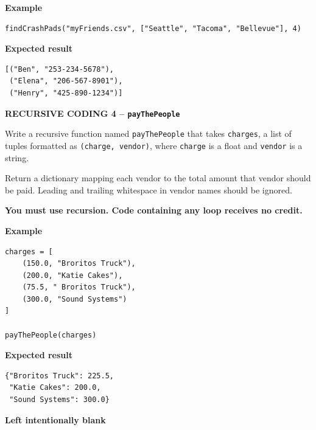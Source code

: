 \documentclass[11pt,addpoints]{exam}
\begin{document}
\begin{questions}
\textbf{Example}
\begin{lstlisting}
findCrashPads("myFriends.csv", ["Seattle", "Tacoma", "Bellevue"], 4)
\end{lstlisting}

\textbf{Expected result}
\begin{lstlisting}
[("Ben", "253-234-5678"),
 ("Elena", "206-567-8901"),
 ("Henry", "425-890-1234")]
\end{lstlisting}

\vfill
\noindent\fbox{\parbox[t][4in][t]{\dimexpr\linewidth-2\fboxsep-2\fboxrule\relax}{\strut}}
\vfill

\newpage
\question[14] \textbf{RECURSIVE CODING 4 -- \texttt{payThePeople}}

Write a recursive function named \texttt{payThePeople} that takes \texttt{charges}, a list of tuples formatted as \texttt{(charge, vendor)}, where \texttt{charge} is a float and \texttt{vendor} is a string.

Return a dictionary mapping each vendor to the total amount that vendor should be paid. Leading and trailing whitespace in vendor names should be ignored.

\textbf{You must use recursion. Code containing any loop receives no credit.}

\textbf{Example}
\begin{lstlisting}
charges = [
    (150.0, "Broritos Truck"),
    (200.0, "Katie Cakes"),
    (75.5, " Broritos Truck"),
    (300.0, "Sound Systems")
]

payThePeople(charges)
\end{lstlisting}

\textbf{Expected result}
\begin{lstlisting}
{"Broritos Truck": 225.5,
 "Katie Cakes": 200.0,
 "Sound Systems": 300.0}
\end{lstlisting}

\vfill
\noindent\fbox{\parbox[t][5in][t]{\dimexpr\linewidth-2\fboxsep-2\fboxrule\relax}{\strut}}
\vfill

\newpage
\begin{center}
\vspace*{3in}
{\Large\bfseries Left intentionally blank}
\end{center}

\end{questions}
\end{document}
